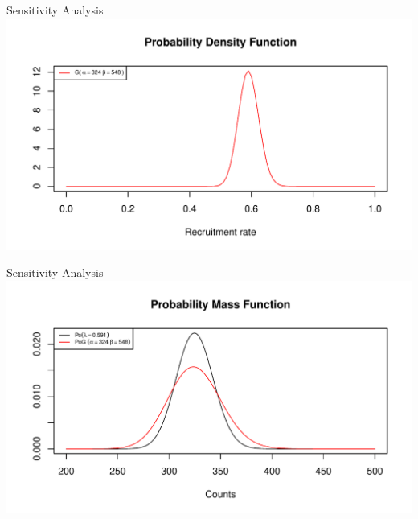 \documentclass[english]{beamer}\usepackage[]{graphicx}\usepackage[]{xcolor}
\makeatletter
\def\maxwidth{ %
  \ifdim\Gin@nat@width>\linewidth
    \linewidth
  \else
    \Gin@nat@width
  \fi
}
\newenvironment{knitrout}{}{} %
\makeatother
\begin{document}
\begin{frame}{Sensitivity Analysis}
\begin{knitrout}
\color{fgcolor}
\includegraphics[width=\maxwidth]{figures/figunnamed-chunk-8-1} 
\end{knitrout}

\end{frame}


\begin{frame}{Sensitivity Analysis}
\begin{knitrout}
\color{fgcolor}
\includegraphics[width=\maxwidth]{figures/figunnamed-chunk-9-1} 
\end{knitrout}

\end{frame}
\end{document}
